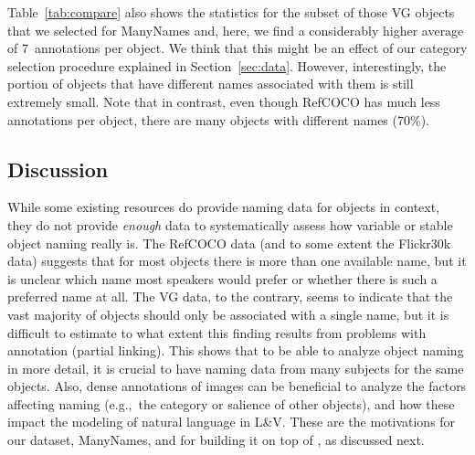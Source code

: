 Table~\ref{tab:compare} also shows the statistics for the subset of those VG objects that we selected for ManyNames and, here, we find a considerably higher average of $7$~annotations per object. 
We think that this might be an effect of our category selection procedure explained in Section~\ref{sec:data}. However, interestingly, the portion of objects that have different names associated with them is still extremely small.
Note that in contrast, even though RefCOCO has much less annotations per object, there are many objects with different names ($70$\%).



\subsection{Discussion}

While some existing resources do provide naming data for objects in context, they do not provide \textit{enough} data to systematically assess how variable or stable object naming really is. The RefCOCO data (and to some extent the Flickr30k data) suggests that for most objects there is more than one available name, but it is unclear which name most speakers would prefer or whether there is such a preferred name at all. 
The VG data, to the contrary, seems to indicate that the vast majority of objects should only be associated with a single name, but it is difficult to estimate to what extent this finding results from problems with annotation (partial linking).
This shows that to be able to analyze object naming in more detail, it is crucial to have naming data from many subjects for the same objects. 
Also, dense annotations of images can be beneficial to analyze the factors affecting naming (e.g.,\ the category or salience of other objects), and how these impact the modeling of natural language in L\&V.
These are the motivations for our dataset, ManyNames, and for building it on top of \vg, as discussed next.

